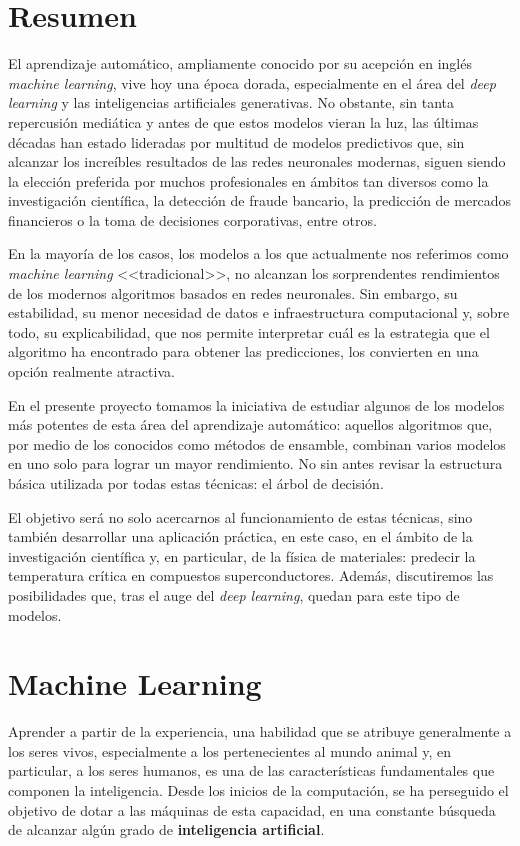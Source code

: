 \documentclass[titlepage, 11pt]{book}
\begin{document}
\chapter*{Resumen}
El aprendizaje automático, ampliamente conocido por su acepción en inglés \textit{machine learning}, vive hoy una época dorada, especialmente en el área del \textit{deep learning} y las inteligencias artificiales generativas. No obstante, sin tanta repercusión mediática y antes de que estos modelos vieran la luz, las últimas décadas han estado lideradas por multitud de modelos predictivos que, sin alcanzar los increíbles resultados de las redes neuronales modernas, siguen siendo la elección preferida por muchos profesionales en ámbitos tan diversos como la investigación científica, la detección de fraude bancario, la predicción de mercados financieros o la toma de decisiones corporativas, entre otros.

En la mayoría de los casos, los modelos a los que actualmente nos referimos como \textit{machine learning} <<tradicional>>, no alcanzan los sorprendentes rendimientos de los modernos algoritmos basados en redes neuronales. Sin embargo, su estabilidad, su menor necesidad de datos e infraestructura computacional y, sobre todo, su explicabilidad, que nos permite interpretar cuál es la estrategia que el algoritmo ha encontrado para obtener las predicciones, los convierten en una opción realmente atractiva.

En el presente proyecto tomamos la iniciativa de estudiar algunos de los modelos más potentes de esta área del aprendizaje automático: aquellos algoritmos que, por medio de los conocidos como métodos de ensamble, combinan varios modelos en uno solo para lograr un mayor rendimiento. No sin antes revisar la estructura básica utilizada por todas estas técnicas: el árbol de decisión.

El objetivo será no solo acercarnos al funcionamiento de estas técnicas, sino también desarrollar una aplicación práctica, en este caso, en el ámbito de la investigación científica y, en particular, de la física de materiales: predecir la temperatura crítica en compuestos superconductores. Además, discutiremos las posibilidades que, tras el auge del \textit{deep learning}, quedan para este tipo de modelos.

\tableofcontents

\chapter{Machine Learning}
Aprender a partir de la experiencia, una habilidad que se atribuye generalmente a los seres vivos, especialmente a los pertenecientes al mundo animal y, en particular, a los seres humanos, es una de las características fundamentales que componen la inteligencia. Desde los inicios de la computación, se ha perseguido el objetivo de dotar a las máquinas de esta capacidad, en una constante búsqueda de alcanzar algún grado de \textbf{inteligencia artificial}.
\end{document}
